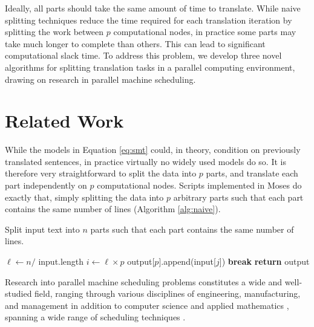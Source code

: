 \documentclass[11pt,letterpaper]{article}
\begin{document}
Ideally, all parts should take the same amount of time to translate. While naive splitting techniques reduce the time required for each translation iteration by splitting the work between $p$ computational nodes, in practice some parts may take much longer to complete than others. This can lead to significant computational slack time.
%
To address this problem, we develop three novel algorithms for splitting translation tasks in a parallel computing environment, drawing on research in parallel machine scheduling.





\section{Related Work}

While the models in Equation \ref{eq:smt} could, in theory, condition on previously translated sentences, in practice virtually no widely used models do so. It is therefore very straightforward to split the data into $p$ parts, and translate each part independently on $p$ computational nodes. Scripts implemented in Moses \cite{moses} do exactly that, simply splitting the data into $p$ arbitrary parts such that each part contains the same number of lines (Algorithm \ref{alg:naive}).

\begin{algorithm}
\caption{Split input text into $n$ parts such that each part contains the same number of lines.}
\begin{algorithmic}
\State $\ell \gets n / $ input.length
\State $i \gets \ell \times p$
\State output[$p$].append(input[$j$])
\Else
\State \textbf{break}
\EndIf
\EndFor
\EndFor
\State \textbf{return} output
\EndFunction
\end{algorithmic}
\label{alg:naive}
\end{algorithm}


Research into parallel machine scheduling problems constitutes a wide and well-studied field, ranging through various disciplines of engineering, manufacturing, and management in addition to computer science and applied mathematics \cite{ChengSin90}, 
spanning a wide range of scheduling techniques \cite{PanwalkarIskander77}.

\end{document}
